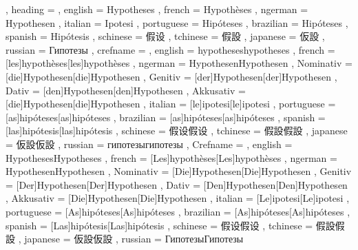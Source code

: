   {
    , heading =   {
                    , english     = Hypotheses
                    , french      = Hypothèses
                    , ngerman     = Hypothesen
                    , italian     = Ipotesi
                    , portuguese  = Hipóteses
                    , brazilian   = Hipóteses
                    , spanish     = Hipótesis
                    , schinese    = 假设
                    , tchinese    = 假設
                    , japanese    = 仮設
                    , russian     = Гипотезы
                  }
    , crefname =  {
                    , english     = {hypotheses}{hypotheses}
                    , french      = [les]{hypothèses}[les]{hypothèses}
                    , ngerman     = { {Hypothesen}{Hypothesen}
                                      , Nominativ = [die]{Hypothesen}[die]{Hypothesen}
                                      , Genitiv   = [der]{Hypothesen}[der]{Hypothesen}
                                      , Dativ     = [den]{Hypothesen}[den]{Hypothesen}
                                      , Akkusativ = [die]{Hypothesen}[die]{Hypothesen}
                                    }
                    , italian     = [le]{ipotesi}[le]{ipotesi}
                    , portuguese  = [as]{hipóteses}[as]{hipóteses}
                    , brazilian   = [as]{hipóteses}[as]{hipóteses}
                    , spanish     = [las]{hipótesis}[las]{hipótesis}
                    , schinese    = {假设}{假设}
                    , tchinese    = {假設}{假設}
                    , japanese    = {仮設}{仮設}
                    , russian     = {гипотезы}{гипотезы}
                  }
    , Crefname =  {
                    , english     = {Hypotheses}{Hypotheses}
                    , french      = [Les]{hypothèses}[Les]{hypothèses}
                    , ngerman     = { {Hypothesen}{Hypothesen}
                                      , Nominativ = [Die]{Hypothesen}[Die]{Hypothesen}
                                      , Genitiv   = [Der]{Hypothesen}[Der]{Hypothesen}
                                      , Dativ     = [Den]{Hypothesen}[Den]{Hypothesen}
                                      , Akkusativ = [Die]{Hypothesen}[Die]{Hypothesen}
                                    }
                    , italian     = [Le]{ipotesi}[Le]{ipotesi}
                    , portuguese  = [As]{hipóteses}[As]{hipóteses}
                    , brazilian   = [As]{hipóteses}[As]{hipóteses}
                    , spanish     = [Las]{hipótesis}[Las]{hipótesis}
                    , schinese    = {假设}{假设}
                    , tchinese    = {假設}{假設}
                    , japanese    = {仮設}{仮設}
                    , russian     = {Гипотезы}{Гипотезы}
                  }
  }

